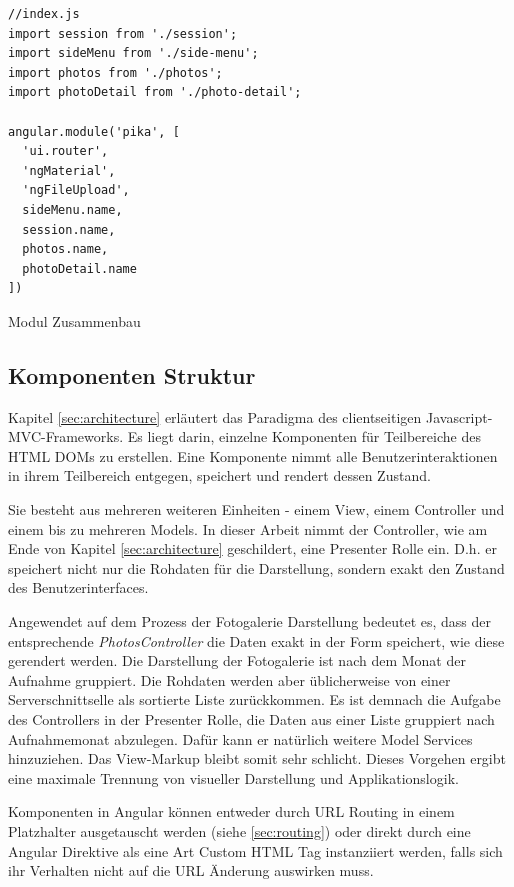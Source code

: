 \begin{listing}[H]
\begin{verbatim}
//index.js
import session from './session';
import sideMenu from './side-menu';
import photos from './photos';
import photoDetail from './photo-detail';

angular.module('pika', [
  'ui.router',
  'ngMaterial',
  'ngFileUpload',
  sideMenu.name,
  session.name,
  photos.name,
  photoDetail.name
])
\end{verbatim}
\caption{Modul Zusammenbau}
\label{lst:module_build}
\end{listing}

\subsection{Komponenten Struktur}

Kapitel \ref{sec:architecture} erläutert das Paradigma des clientseitigen Javascript-MVC-Frameworks. Es liegt darin, einzelne Komponenten für Teilbereiche des HTML DOMs zu erstellen. Eine Komponente nimmt alle Benutzerinteraktionen in ihrem Teilbereich entgegen, speichert und rendert dessen Zustand.

Sie besteht aus mehreren weiteren Einheiten - einem View, einem Controller und einem bis zu mehreren Models. In dieser Arbeit nimmt der Controller, wie am Ende von  Kapitel \ref{sec:architecture} geschildert, eine Presenter Rolle ein. D.h. er speichert nicht nur die Rohdaten für die Darstellung, sondern exakt den Zustand des Benutzerinterfaces.

Angewendet auf dem Prozess der Fotogalerie Darstellung bedeutet es, dass der entsprechende \textit{PhotosController} die Daten exakt in der Form speichert, wie diese gerendert werden. Die Darstellung der Fotogalerie ist nach dem Monat der Aufnahme gruppiert. Die Rohdaten werden aber üblicherweise von einer Serverschnittselle als sortierte Liste zurückkommen. Es ist demnach die Aufgabe des Controllers in der Presenter Rolle, die Daten aus einer Liste gruppiert nach Aufnahmemonat abzulegen. Dafür kann er natürlich weitere Model Services hinzuziehen. Das View-Markup bleibt somit sehr schlicht. Dieses Vorgehen ergibt eine maximale Trennung von visueller Darstellung und Applikationslogik.

Komponenten in Angular können entweder durch URL Routing in einem Platzhalter ausgetauscht werden (siehe \ref{sec:routing}) oder direkt durch eine Angular Direktive als eine Art Custom HTML Tag instanziiert werden, falls sich ihr Verhalten nicht auf die URL Änderung auswirken muss.

